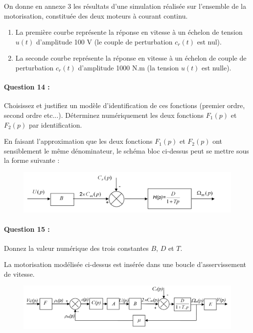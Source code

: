 On donne en annexe 3 les résultats d'une simulation réalisée sur l'ensemble de la motorisation, constituée des deux moteurs à courant continu.

\begin{enumerate}
 \item La première courbe représente la réponse en vitesse à un échelon de tension $u(t)$ d'amplitude 100 V (le couple de perturbation $c_r(t)$ est nul).
 \item La seconde courbe représente la réponse en vitesse à un échelon de couple de perturbation $c_r(t)$ d'amplitude 1000 N.m (la tension $u(t)$ est nulle).
\end{enumerate}

\paragraph{Question 14 :} Choisissez et justifiez un modèle d'identification de ces fonctions (premier ordre, second ordre etc...). Déterminez numériquement les deux fonctions $F_1(p)$ et $F_2(p)$ par identification.

En faisant l'approximation que les deux fonctions $F_1(p)$ et $F_2(p)$ ont sensiblement le même dénominateur, le schéma bloc ci-dessus peut se mettre sous la forme suivante :

\begin{figure}[!h]
\centering
\includegraphics[width=0.8\linewidth]{img/fig27}
\label{fig27}
\end{figure}

\paragraph{Question 15 :} Donnez la valeur numérique des trois constantes $B$, $D$ et $T$.


La motorisation modélisée ci-dessus est insérée dans une boucle d'asservissement de vitesse.

\begin{figure}[!h]
\centering
\includegraphics[width=0.8\linewidth]{img/fig28}
\label{fig28}
\end{figure}


